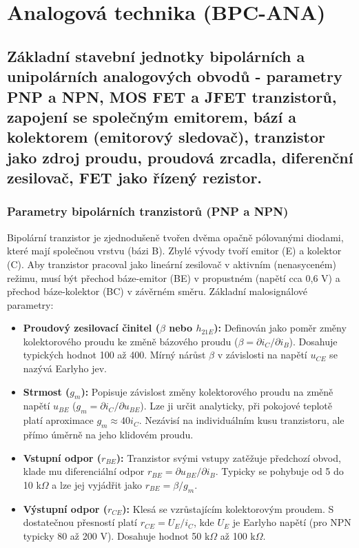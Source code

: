\section{Analogová technika (BPC-ANA)}
\subsection{Základní stavební jednotky bipolárních a unipolárních analogových obvodů - parametry PNP a NPN, MOS FET a JFET tranzistorů, zapojení se společným emitorem, bází a kolektorem (emitorový sledovač), tranzistor jako zdroj proudu, proudová zrcadla, diferenční zesilovač, FET jako řízený rezistor.}
    \subsubsection{Parametry bipolárních tranzistorů (PNP a NPN)}
        Bipolární tranzistor je zjednodušeně tvořen dvěma opačně pólovanými diodami, které mají společnou vrstvu (bázi B). Zbylé vývody tvoří emitor (E) a kolektor (C). Aby tranzistor pracoval jako lineární zesilovač v aktivním (nenasyceném) režimu, musí být přechod báze-emitor (BE) v propustném (napětí cca 0,6 V) a přechod báze-kolektor (BC) v závěrném směru. Základní malosignálové parametry:
        
        \begin{itemize}
            \item \textbf{Proudový zesilovací činitel ($\beta$ nebo $h_{21E}$):} Definován jako poměr změny kolektorového proudu ke změně bázového proudu ($\beta = \partial i_C / \partial i_B$). Dosahuje typických hodnot 100 až 400. Mírný nárůst $\beta$ v závislosti na napětí $u_{CE}$ se nazývá Earlyho jev.
            \item \textbf{Strmost ($g_m$):} Popisuje závislost změny kolektorového proudu na změně napětí $u_{BE}$ ($g_m = \partial i_C / \partial u_{BE}$). Lze ji určit analyticky, při pokojové teplotě platí aproximace $g_m \approx 40i_C$. Nezávisí na individuálním kusu tranzistoru, ale přímo úměrně na jeho klidovém proudu.
            \item \textbf{Vstupní odpor ($r_{BE}$):} Tranzistor svými vstupy zatěžuje předchozí obvod, klade mu diferenciální odpor $r_{BE} = \partial u_{BE} / \partial i_B$. Typicky se pohybuje od 5 do 10 k$\Omega$ a lze jej vyjádřit jako $r_{BE} = \beta / g_m$.
            \item \textbf{Výstupní odpor ($r_{CE}$):} Klesá se vzrůstajícím kolektorovým proudem. S dostatečnou přesností platí $r_{CE} = U_E / i_C$, kde $U_E$ je Earlyho napětí (pro NPN typicky 80 až 200 V). Dosahuje hodnot 50 k$\Omega$ až 100 k$\Omega$.
        \end{itemize}
